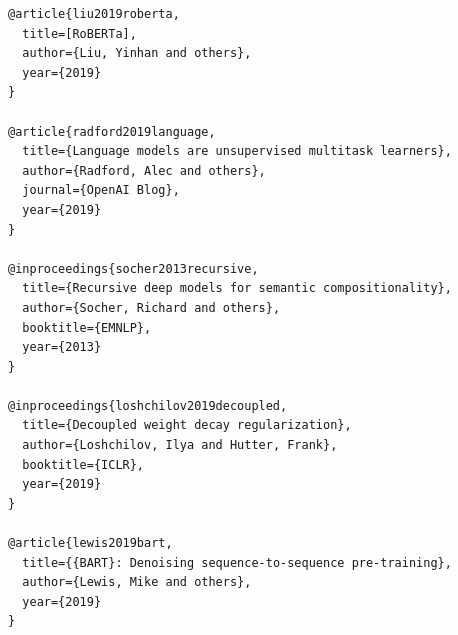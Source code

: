 \begin{lstlisting}
@article{liu2019roberta,
  title=[RoBERTa],
  author={Liu, Yinhan and others},
  year={2019}
}

@article{radford2019language,
  title={Language models are unsupervised multitask learners},
  author={Radford, Alec and others},
  journal={OpenAI Blog},
  year={2019}
}

@inproceedings{socher2013recursive,
  title={Recursive deep models for semantic compositionality},
  author={Socher, Richard and others},
  booktitle={EMNLP},
  year={2013}
}

@inproceedings{loshchilov2019decoupled,
  title={Decoupled weight decay regularization},
  author={Loshchilov, Ilya and Hutter, Frank},
  booktitle={ICLR},
  year={2019}
}

@article{lewis2019bart,
  title={{BART}: Denoising sequence-to-sequence pre-training},
  author={Lewis, Mike and others},
  year={2019}
}
\end{lstlisting}

